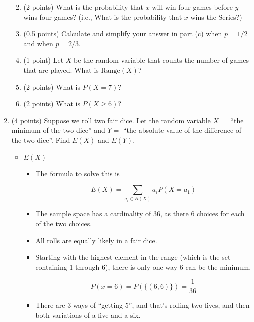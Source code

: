 \documentclass[11pt]{article}
\newcommand{\Range}{{\mathrm{Range}}}
\begin{document}
\begin{enumerate}
\begin{enumerate}
\begin{itemize}
	\end{itemize}
	
	\item (2 points) What is the probability that $x$ will win four games before
	$y$ wins four games?  (i.e., What is the probability that $x$ wins
	the Series?)
	
	
	
	\item (0.5 points) Calculate and simplify your answer in part (c) when $p=1/2$
	and when $p=2/3$.
	
	\item (1 point) Let $X$ be the random variable that counts the number of games
	that are played.  What is $\Range(X)$?
	
	\item (2 points) What is $P(X=7)$?
	
	\item (2 points) What is $P(X\geq 6)$?
\end{enumerate}

\item (4 points) Suppose we roll two fair dice.  Let the random variable $X=$
``the minimum of the two dice'' and $Y =$ ``the absolute value of the
difference of the two dice''.  Find $E(X)$ and $E(Y)$.

\begin{itemize}

	\item $E(X)$
	
	\begin{itemize}
	
		\item The formula to solve this is
		
			  \[E(X) = \sum_{a_i \in R(X)}a_i P(X = a_1)\]
			
		\item The sample space has a cardinality of 36, as there 6 choices for each of the two choices.
		\item All rolls are equally likely in a fair dice.
		\item Starting with the highest element in the range (which is the set containing 1 through 6), there is only one way 6 can be the minimum.
	
			  \[P(x = 6) = P(\lbrace(6, 6) \rbrace) = \frac{1}{36}\]
			  
		\item There are 3 ways of ``getting 5'', and that's rolling two fives, and then both variations of a five and a six.
		

\end{itemize}
\end{itemize}
\end{enumerate}
\end{document}
